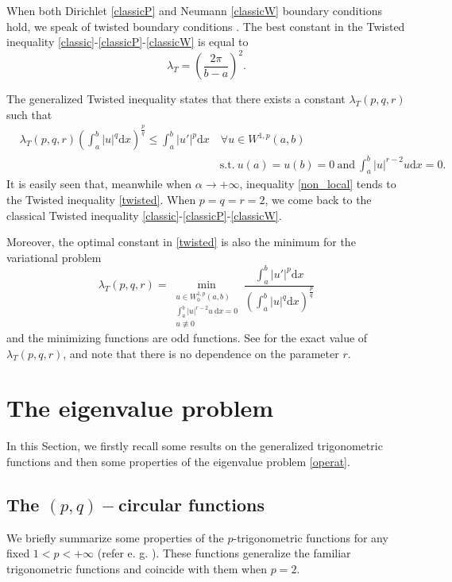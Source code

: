 \documentclass{amsart}
\theoremstyle{definition}
\theoremstyle{remark}
\begin{document}
When both Dirichlet \eqref{classicP} and Neumann \eqref{classicW} boundary conditions hold, we speak of twisted boundary conditions \cite{BB, FH}. The best constant in the Twisted inequality \eqref{classic}-\eqref{classicP}-\eqref{classicW} is equal to 
\[
\lambda_T=\left(\frac{2\pi}{b-a}\right)^2.
\] 

The generalized Twisted inequality states that there exists a constant $\lambda_T(p,q,r)$ such that
\begin{equation}\label{twisted}
\begin{split}
&\lambda_T(p,q,r) \left(\int_a^b|u|^q\text{d}x\right)^\frac pq\leq\int_a^b|u'|^p\text{d}x\quad\forall u \in W^{1,p}(a,b)\\
&\qquad\qquad\qquad\qquad\qquad\qquad\qquad\qquad\qquad \text{s.t.}\ u(a)=u(b)=0\ \text{and}\ \int_a^b |u|^{r-2}u\text{d}x=0.
\end{split}
\end{equation}
It is easily seen that, meanwhile when $\alpha\to + \infty$, inequality \eqref{non_local} tends to the Twisted inequality \eqref{twisted}.
When $p=q=r=2$, we come back to the classical Twisted inequality \eqref{classic}-\eqref{classicP}-\eqref{classicW}. 

Moreover, the optimal constant in \eqref{twisted} is also the minimum for the variational problem
\begin{equation}
\label{eigenT}
\lambda_T(p,q,r) =\min_{\substack{u \in W^{1,p}_0(a,b)\\ \int_a^b |u|^{r-2}u\ \text{d}x=0\\ u\not\equiv 0 }}\frac{ \int_a^b|u'|^p\text{d}x}{\left(\int_a^b|u|^q\text{d}x\right)^\frac pq}
\end{equation}
and the minimizing functions are odd functions. See \cite[Thm. 1.1]{CD} for the exact value of $\lambda_T(p,q,r)$, and note that there is no dependence on the parameter $r$.



\section{The eigenvalue problem}
\label{sec_eig}
In this Section, we firstly recall some results on the generalized trigonometric functions and then some properties of the eigenvalue problem \eqref{operat}.

\subsection{The $(p,q)-$circular functions} 
We briefly summarize some properties of the $p$-trigonometric functions for any fixed $1<p<+\infty$ (refer e. g. \cite{LE, L, Pe}). These functions generalize the familiar trigonometric functions and coincide with them when $p=2$.
\end{document}
